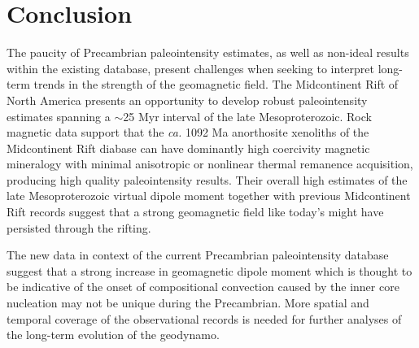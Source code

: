 \documentclass[draft]{agujournal2019}
\begin{document}





\section*{Conclusion}

The paucity of Precambrian paleointensity estimates, as well as non-ideal results within the existing database, present challenges when seeking to interpret long-term trends in the strength of the geomagnetic field. The Midcontinent Rift of North America presents an opportunity to develop robust paleointensity estimates spanning a $\sim$25 Myr interval of the late Mesoproterozoic. Rock magnetic data support that the \textit{ca.} 1092 Ma anorthosite xenoliths of the Midcontinent Rift diabase can have dominantly high coercivity magnetic mineralogy with minimal anisotropic or nonlinear thermal remanence acquisition, producing high quality paleointensity results. Their overall high estimates of the late Mesoproterozoic virtual dipole moment together with previous Midcontinent Rift records suggest that a strong geomagnetic field like today's might have persisted through the rifting. 

The new data in context of the current Precambrian paleointensity database suggest that a strong increase in geomagnetic dipole moment which is thought to be indicative of the onset of compositional convection caused by the inner core nucleation may not be unique during the Precambrian. More spatial and temporal coverage of the observational records is needed for further analyses of the long-term evolution of the geodynamo. 
\end{document}
